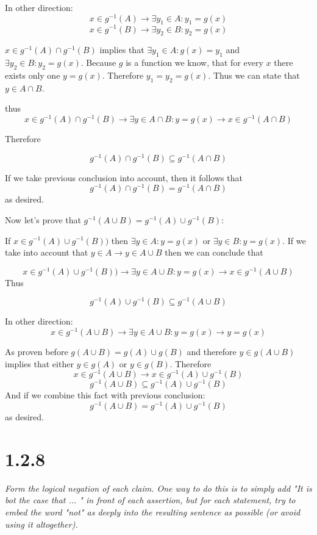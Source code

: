 \documentclass[11pt,oneside,titlepage]{book}
\begin{document}
In other direction: 
$$x \in g^{-1}(A) \to \exists y_1 \in A: y_1 = g(x)$$
$$x \in g^{-1}(B) \to \exists y_2 \in B: y_2 = g(x)$$

$x \in g^{-1}(A) \cap g^{-1}(B)$ implies that $ \exists y_1 \in A: g(x) = y_1$ and $\exists y_2 \in B: y_2 = g(x)$. Because $g$ is a function we know, that
for every $x$ there exists only one $y = g(x)$. Therefore $y_1 = y_2 = g(x)$.
Thus we can state that $y \in A \cap B$.

thus
$$x \in g^{-1}(A) \cap g^{-1}(B) \to \exists y \in A \cap B: y = g(x) \to
x \in g^{-1}(A \cap B)$$

Therefore 

$$ g^{-1}(A) \cap g^{-1}(B) \subseteq   g^{-1}(A \cap B)$$

If we take previous conclusion into account, then it follows that
$$ g^{-1}(A) \cap g^{-1}(B) = g^{-1}(A \cap B)$$
as desired.

Now let's prove that  $g^{-1}(A \cup B) = g^{-1}(A) \cup g^{-1}(B)$:


If $ x \in g^{-1}(A) \cup g^{-1}(B))$ then  $\exists y \in A: y = g(x)$ or
$\exists y \in B: y = g(x)$. If we take into account that $y \in A \to y \in A \cup B$ then we can conclude that

$$ x \in g^{-1}(A) \cup g^{-1}(B)) \to \exists y \in A \cup B : y = g(x) \to
x \in g^{-1}(A \cup B)$$
Thus

$$g^{-1}(A) \cup g^{-1}(B) \subseteq g^{-1}(A \cup B)$$

In other direction: 
$$x \in g^{-1}(A \cup B) \to \exists y \in A \cup B: y = g(x) \to y = g(x)$$

As proven before $g(A \cup B) = g(A) \cup g(B)$ and therefore
$y \in g(A \cup B)$ implies that either $y \in g(A)$ or $y \in g(B)$. Therefore
$$ x \in g^{-1}(A \cup B) \to x \in g^{-1}(A) \cup g^{-1}(B)$$
$$ g^{-1}(A \cup B)  \subseteq g^{-1}(A) \cup g^{-1}(B)$$
And if we combine this fact with previous conclusion:
$$ g^{-1}(A \cup B) =  g^{-1}(A) \cup g^{-1}(B)$$
as desired.

\section*{1.2.8}

\textit{Form the logical negation of each claim. One way to do this is to
  simply add "It is bot the case that ... " in front of each assertion, but for
  each statement, try to embed the word "not" as deeply into the resulting
  sentence as possible (or avoid using it altogether).}
\end{document}
